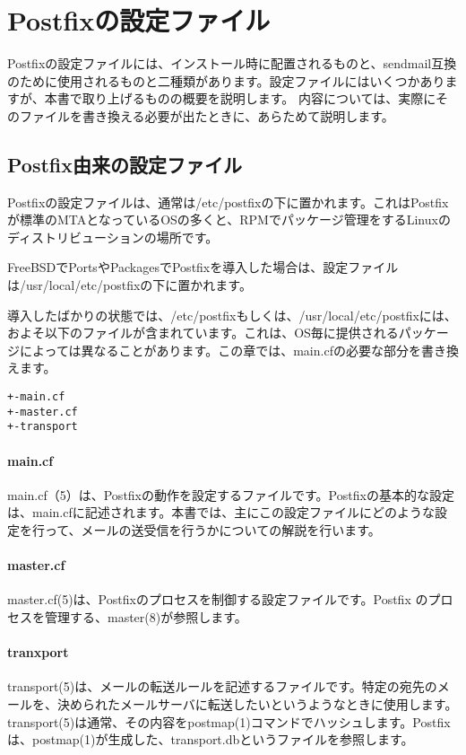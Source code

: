 \section{Postfixの設定ファイル}
Postfixの設定ファイルには、インストール時に配置されるものと、sendmail互換のために使用されるものと二種類があります。設定ファイルにはいくつかありますが、本書で取り上げるものの概要を説明します。
内容については、実際にそのファイルを書き換える必要が出たときに、あらためて説明します。

\subsection{Postfix由来の設定ファイル}

Postfixの設定ファイルは、通常は/etc/postfixの下に置かれます。これはPostfixが標準のMTAとなっているOSの多くと、RPMでパッケージ管理をするLinuxのディストリビューションの場所です。

FreeBSDでPortsやPackagesでPostfixを導入した場合は、設定ファイルは/usr/local/etc/postfixの下に置かれます。

導入したばかりの状態では、/etc/postfixもしくは、/usr/local/etc/postfixには、およそ以下のファイルが含まれています。これは、OS毎に提供されるパッケージによっては異なることがあります。この章では、main.cfの必要な部分を書き換えます。

\begin{verbatim}
+-main.cf
+-master.cf
+-transport
\end{verbatim}

\paragraph{main.cf}
main.cf（5）は、Postfixの動作を設定するファイルです。Postfixの基本的な設定は、main.cfに記述されます。本書では、主にこの設定ファイルにどのような設定を行って、メールの送受信を行うかについての解説を行います。

\paragraph{master.cf}
master.cf(5)は、Postfixのプロセスを制御する設定ファイルです。Postfix
のプロセスを管理する、master(8)が参照します。

\paragraph{tranxport}
transport(5)は、メールの転送ルールを記述するファイルです。特定の宛先のメールを、決められたメールサーバに転送したいというようなときに使用します。
transport(5)は通常、その内容をpostmap(1)コマンドでハッシュします。Postfixは、postmap(1)が生成した、transport.dbというファイルを参照します。


